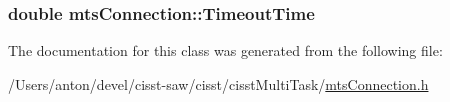 \subsubsection[{Timeout\+Time}]{\setlength{\rightskip}{0pt plus 5cm}double mts\+Connection\+::\+Timeout\+Time\hspace{0.3cm}{\ttfamily [protected]}}\label{classmts_connection_a6c190911c627762bcdc0a2145a6739c8}


The documentation for this class was generated from the following file\+:\begin{DoxyCompactItemize}
\item 
/\+Users/anton/devel/cisst-\/saw/cisst/cisst\+Multi\+Task/\hyperlink{mts_connection_8h}{mts\+Connection.\+h}\end{DoxyCompactItemize}

